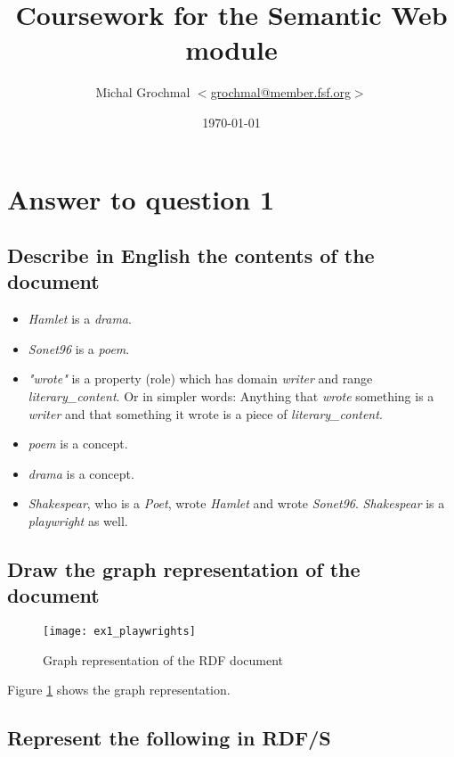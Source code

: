 \documentclass[a4paper,12pt]{article}
\title{Coursework for the Semantic Web module}
\author{Michal Grochmal
  $<$\href{mailto:grochmal@member.fsf.org}{grochmal@member.fsf.org}$>$
}
\date{\today}
\begin{document}
\VerbatimFootnotes
\maketitle

\section[Question 1]{Answer to question 1}
\subsection[Describe]{Describe in English the contents of the document}
\begin{itemize}
\item[]\emph{Hamlet} is a \emph{drama}.

\item[]\emph{Sonet96} is a \emph{poem}.

\item[]\emph{"wrote"} is a property (role) which has domain \emph{writer} and
range \emph{literary\_content}.  Or in simpler words: Anything that
\emph{wrote} something is a \emph{writer} and that something it wrote is a
piece of \emph{literary\_content}.

\item[]\emph{poem} is a concept.

\item[]\emph{drama} is a concept.

\item[]\emph{Shakespear}, who is a \emph{Poet}, wrote \emph{Hamlet} and wrote
\emph{Sonet96}.  \emph{Shakespear} is a \emph{playwright} as well.
\end{itemize}

\subsection[Draw]{Draw the graph representation of the document}
\begin{figure}[!htp]
\centering
\texttt{[image: ex1\_playwrights]}
\caption{Graph representation of the RDF document}
\label{shakespear}
\end{figure}
Figure \ref{shakespear} shows the graph representation.

\subsection[RDF/S]{Represent the following in RDF/S}
\end{document}
